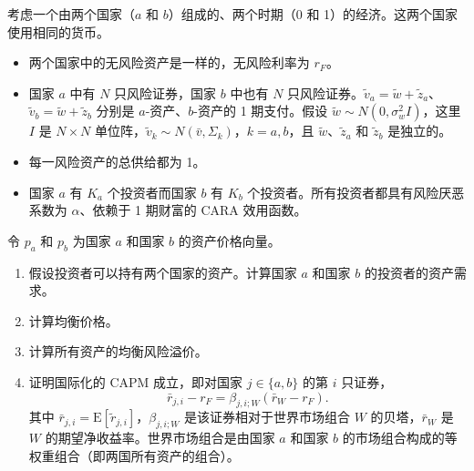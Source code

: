 \par\noindent\begin{minipage}{\linewidth}
\begin{problem}
 考虑一个由两个国家（$a$ 和 $b$）组成的、两个时期（0 和 1）的经济。这两个国家使用相同的货币。
\begin{itemize}
    \item 两个国家中的无风险资产是一样的，无风险利率为 $r_{F}$。
    \item 国家 $a$ 中有 $N$ 只风险证券，国家 $b$ 中也有 $N$ 只风险证券。$\tilde{v}_{a}=\tilde{w}+\tilde{z}_{a}$、$\tilde{v}_{b}=\tilde{w}+\tilde{z}_{b}$ 分别是 $a$-资产、$b$-资产的 1 期支付。假设 $\tilde{w}\sim N(0,\sigma_{w}^{2}I)$，这里 $I$ 是 $N\times N$ 单位阵，$\tilde{v}_{k}\sim N(\bar{v},\Sigma_{k})$，$k=a,b$，且 $\tilde{w}$、$\tilde{z}_{a}$ 和 $\tilde{z}_{b}$ 是独立的。
    \item 每一风险资产的总供给都为 1。
    \item 国家 $a$ 有 $K_{a}$ 个投资者而国家 $b$ 有 $K_{b}$ 个投资者。所有投资者都具有风险厌恶系数为 $\alpha$、依赖于 1 期财富的 CARA 效用函数。
\end{itemize}
令 $p_{a}$ 和 $p_{b}$ 为国家 $a$ 和国家 $b$ 的资产价格向量。
\begin{enumerate}[label=(\alph*)]
    \item 假设投资者可以持有两个国家的资产。计算国家 $a$ 和国家 $b$ 的投资者的资产需求。
    \item 计算均衡价格。
    \item 计算所有资产的均衡风险溢价。
    \item 证明国际化的 CAPM 成立，即对国家 $j\in\{a,b\}$ 的第 $i$ 只证券，
    \[
        \bar r_{j,i}-r_F=\beta_{j,i;W}(\bar r_W-r_F).
    \]
    其中 $\bar r_{j,i}=\mathrm E[\widetilde r_{j,i}]$，$\beta_{j,i;W}$ 是该证券相对于世界市场组合 $W$ 的贝塔，$\bar r_W$ 是 $W$ 的期望净收益率。世界市场组合是由国家 $a$ 和国家 $b$ 的市场组合构成的等权重组合（即两国所有资产的组合）。
\end{enumerate}
\end{problem}
\end{minipage}\par
{}
